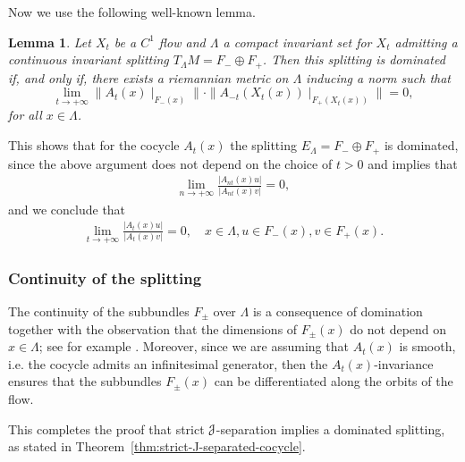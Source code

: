 \documentclass[12pt,reqno]{amsart}
\numberwithin{equation}{section}
\theoremstyle{plain}
\newtheorem{lemma}[theorem]{Lemma}
\theoremstyle{definition}
\newcommand{\J}{\EuScript{J}}
\begin{document}
Now we use the following well-known lemma.

\begin{lemma}\label{le:dom-split-equiv}
  Let $X_t$ be a $C^1$ flow and $\Lambda$ a compact
  invariant set for $X_t$ admitting a continuous invariant
  splitting $T_{\Lambda}M = F_- \oplus F_+$. Then this
  splitting is dominated if, and only if, there exists a
  riemannian metric on $\Lambda$ inducing a norm such that
  $$
  \lim_{t\to+\infty}\|A_t(x)\mid_{F_-(x)}\|
  \cdot\|A_{-t}(X_t(x))\mid_{F_+(X_t(x))}\| = 0,
  $$
  for all $x \in \Lambda$.
\end{lemma}


This shows that for the cocycle $A_t(x)$ the splitting
$E_\Lambda=F_-\oplus F_+$ is dominated, since the above argument
does not depend on the choice of $t>0$ and implies that
\begin{align*}
 \lim\limits_{n\to+\infty}\frac{ |A_{nt}(x)u|}{|A_{nt}(x) v|} = 0,
\end{align*}
and we conclude that
\begin{align*}
\lim\limits_{t\to+\infty}  \frac{|A_{t}(x)u|}{|A_{t}(x) v|} = 0,
\quad x\in\Lambda, u\in F_-(x), v\in F_+(x).
\end{align*}

\subsubsection{Continuity of the splitting}
\label{sec:continuity-splitting}

The continuity of the subbundles $F_\pm$ over $\Lambda$ is a
consequence of domination together with the observation that
the dimensions of $F_\pm(x)$ do not depend on $x\in
\Lambda$; see for example \cite[Appendix
B]{BDV2004}. Moreover, since we are assuming that $A_t(x)$
is smooth, i.e. the cocycle admits an infinitesimal
generator, then the $A_t(x)$-invariance ensures that the
subbundles $F_\pm(x)$ can be differentiated along the orbits
of the flow.

This completes the proof that strict $\J$-separation implies
a dominated splitting, as stated in
Theorem~\ref{thm:strict-J-separated-cocycle}.




\end{document}
